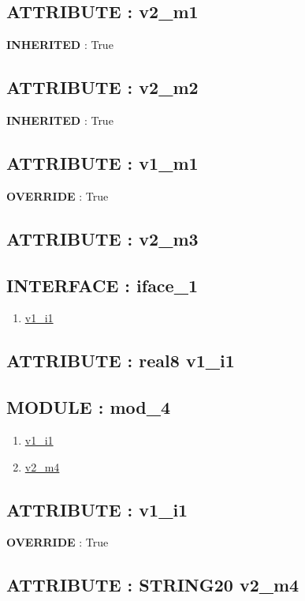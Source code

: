 \subsection*{ATTRIBUTE : v2\_m1}
\hypertarget{ecldoc:example_2_example_2.mod_1.v2_m1}{}
\textbf{INHERITED} : True \\
\subsection*{ATTRIBUTE : v2\_m2}
\hypertarget{ecldoc:example_2_example_2.mod_2.v2_m2}{}
\textbf{INHERITED} : True \\
\subsection*{ATTRIBUTE : v1\_m1}
\hypertarget{ecldoc:example_2_example_2.mod_3.v1_m1}{}
\textbf{OVERRIDE} : True \\
\subsection*{ATTRIBUTE : v2\_m3}
\hypertarget{ecldoc:example_2_example_2.mod_3.v2_m3}{}

\subsection*{INTERFACE : iface\_1}
\hypertarget{ecldoc:example_2_example_2.iface_1}{}
\begin{enumerate}
\item \hyperlink{ecldoc:example_2_example_2.iface_1.v1_i1}{v1\_i1}
\end{enumerate}
\subsection*{ATTRIBUTE : real8 v1\_i1}
\hypertarget{ecldoc:example_2_example_2.iface_1.v1_i1}{}

\subsection*{MODULE : mod\_4}
\hypertarget{ecldoc:example_2_example_2.mod_4}{}
\begin{enumerate}
\item \hyperlink{ecldoc:example_2_example_2.mod_4.v1_i1}{v1\_i1}
\item \hyperlink{ecldoc:example_2_example_2.mod_4.v2_m4}{v2\_m4}
\end{enumerate}
\subsection*{ATTRIBUTE : v1\_i1}
\hypertarget{ecldoc:example_2_example_2.mod_4.v1_i1}{}
\textbf{OVERRIDE} : True \\
\subsection*{ATTRIBUTE : STRING20 v2\_m4}
\hypertarget{ecldoc:example_2_example_2.mod_4.v2_m4}{}


